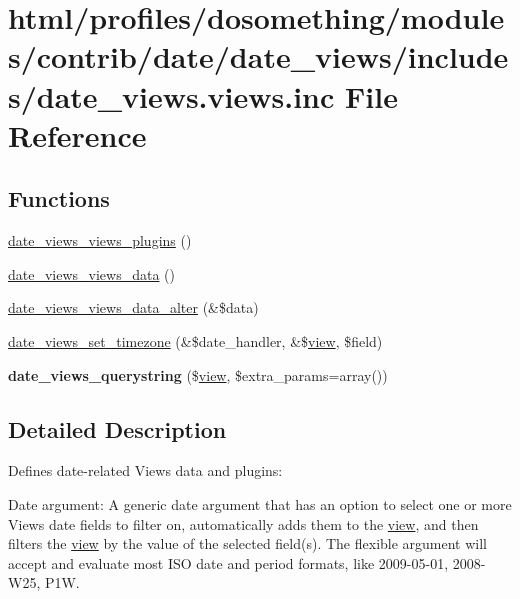 \hypertarget{date__views_8views_8inc}{
\section{html/profiles/dosomething/modules/contrib/date/date\_\-views/includes/date\_\-views.views.inc File Reference}
\label{date__views_8views_8inc}
}
\subsection*{Functions}
\begin{DoxyCompactItemize}
\item 
\hyperlink{date__views_8views_8inc_ac32ded8326bcca6885e284118e3c7b9b}{date\_\-views\_\-views\_\-plugins} ()
\item 
\hyperlink{date__views_8views_8inc_ad639fe30ca54804e01b7581bf2f3dac8}{date\_\-views\_\-views\_\-data} ()
\item 
\hyperlink{date__views_8views_8inc_aa64f1dee5e19f00557a74ff02c6ad624}{date\_\-views\_\-views\_\-data\_\-alter} (\&\$data)
\item 
\hyperlink{date__views_8views_8inc_a0e1c5073d0a78a816eb80e199b9be3c9}{date\_\-views\_\-set\_\-timezone} (\&\$date\_\-handler, \&\$\hyperlink{classview}{view}, \$field)
\item 
\hypertarget{date__views_8views_8inc_a4bfd3e33950437cc5da56d519a0259a2}{
{\bfseries date\_\-views\_\-querystring} (\$\hyperlink{classview}{view}, \$extra\_\-params=array())}
\label{date__views_8views_8inc_a4bfd3e33950437cc5da56d519a0259a2}

\end{DoxyCompactItemize}


\subsection{Detailed Description}
Defines date-\/related Views data and plugins:

Date argument: A generic date argument that has an option to select one or more Views date fields to filter on, automatically adds them to the \hyperlink{classview}{view}, and then filters the \hyperlink{classview}{view} by the value of the selected field(s). The flexible argument will accept and evaluate most ISO date and period formats, like 2009-\/05-\/01, 2008-\/W25, P1W.

